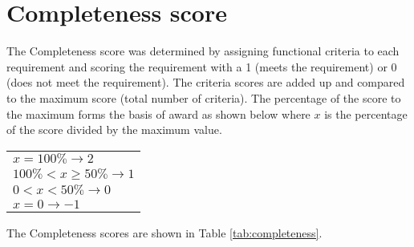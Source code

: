 \section{Completeness score}
The Completeness score was determined by assigning functional criteria to each requirement and scoring the requirement with a 1 (meets the requirement) or 0 (does not meet the requirement). The criteria scores are added up and compared to the maximum score (total number of criteria).  The percentage of the score to the maximum forms the basis of award as shown below where $x$ is the percentage of the score divided by the maximum value.

\centering
\begin{tabular}{l}
$x = 100\% \rightarrow 2$ \\
$100\% <x \ge50\% \rightarrow 1$ \\
$0<x <50\%\rightarrow 0 $\\
$x=0\rightarrow -1$
\end{tabular}


The Completeness scores are shown in Table \ref{tab:completeness}.

